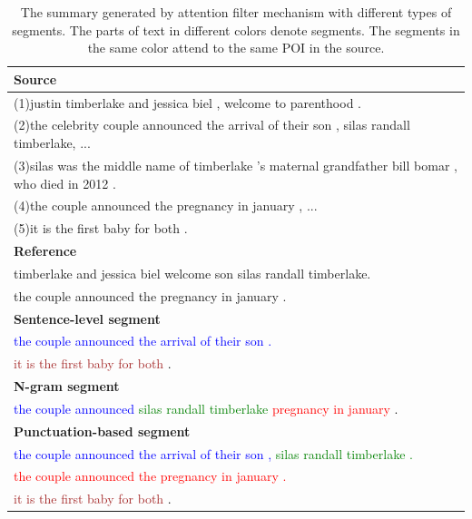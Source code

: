 \begin{table}[th!]
\begin{center}
\caption{The summary generated by attention filter mechanism with different types of segments. 
The parts of text in different colors denote segments. The segments in the same color attend to the same POI in the source.}
\begin{tabular}{l}
\toprule[1pt] 
\textbf{Source} \\
\hline 
(1)justin timberlake and jessica biel , welcome to parenthood . \\
(2)the celebrity couple announced the arrival of their son , silas randall timberlake, ... \\
(3)silas was the middle name of timberlake ’s maternal grandfather bill bomar , who died in 2012 .\\
(4)the couple announced the pregnancy in january , ... \\
(5)it is the first baby for both .  \\
\cmidrule[1pt]{1-1}
\textbf{Reference} \\
\hline 
timberlake and jessica biel welcome son silas randall timberlake. \\
the couple announced the pregnancy in january . \\
\cmidrule[1pt]{1-1} 
\textbf{Sentence-level segment} \\
\hline \textcolor{blue}{the couple announced the arrival of their son .} \\
	   \textcolor{brown}{it is the first baby for both} \textcolor{black}{.}  \\
\cmidrule[1pt]{1-1} 
\textbf{N-gram segment} \\
\hline \textcolor{blue}{the couple announced} \textcolor{green}{silas randall timberlake} \textcolor{red}{pregnancy in january }  \textcolor{black}{.}\\
\cmidrule[1pt]{1-1}
\textbf{Punctuation-based segment} \\
\hline \textcolor{blue}{the couple announced the arrival of their son ,} \textcolor{green}{silas randall timberlake .} \\
       \textcolor{red}{the couple announced the pregnancy in january .} \\ 
	   \textcolor{brown}{it is the first baby for both} \textcolor{black}{.} \\
\bottomrule[1pt] 
\end{tabular}
\label{tab:punct}
\end{center}
\end{table}

